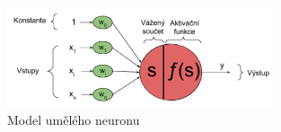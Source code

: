 \begin{figure}[]
    \centering
    \includegraphics[width=0.7\textwidth]{Figures/neuron.png}
    \caption{Model umělého neuronu \cite{lagan}}
    \label{fig:neuron}
\end{figure}








